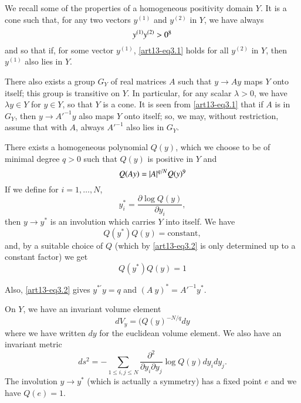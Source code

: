 We recall some of the properties of a homogeneous positivity domain $Y$. It is a cone such that, for any two vectors $y^{(1)}$ and $y^{(2)}$ in $Y$, we have always 
\setcounter{equation}{0}
\begin{equation}
y^{(1)}y^{(2)}>0\footnotemark[8]\label{art13-eq3.1}
\end{equation}
and so that if, for some vector $y^{(1)}$, \eqref{art13-eq3.1} holds for all $y^{(2)}$ in $Y$, then $y^{(1)}$ also lies in $Y$.

There also exists a group $G_{Y}$ of real matrices $A$ such that $y\to Ay$ maps $Y$ onto itself; this group is transitive on $Y$. In particular, for any scalar $\lambda>0$, we have $\lambda y\in Y$ for $y\in Y$, so that $Y$ is a cone. It is seen from \eqref{art13-eq3.1} that if $A$ is in $G_{Y}$, then $y\to {A'}^{-1}y$ also maps $Y$ onto itself; so, we may, without restriction, assume that with $A$, always ${A'}^{-1}$ also lies in $G_{Y}$.

There exists a homogeneous polynomial $Q(y)$, which we choose to be of minimal degree $q>0$ such that $Q(y)$ is positive in $Y$ and 
\begin{equation}
Q(Ay)=|A|^{q/N}Q(y)\footnotemark[9]\label{art13-eq3.2}
\end{equation}\pageoriginale
If we define for $i=1,\ldots,N$,\footnotemark[9]
\begin{equation}
y^{*}_{i}=\dfrac{\partial \log Q(y)}{\partial y_{i}},\label{art13-eq3.3}
\end{equation}
then $y\to y^{*}$ is an involution which carries $Y$ into itself. We have\footnotemark[9]
\begin{equation}
Q(y^{*})Q(y)=\text{constant},\label{art13-eq3.4}
\end{equation}
and, by a suitable choice of $Q$ (which by \eqref{art13-eq3.2} is only determined up to a constant factor) we get
\begin{equation*}
Q(y^{*})Q(y)=1\tag{3.4$'$}\label{art13-eq3.4'}
\end{equation*}

Also, \eqref{art13-eq3.2} gives $y^{*'}y=q$ and $(A \ y)^{*}={A'}^{-1}y^{*}$.

On $Y$, we have an invariant volume element
\begin{equation}
dV_{y}=(Q(y)^{-N/q}dy\label{art13-eq3.5}
\end{equation}
where we have written $dy$ for the euclidean volume element. We also have an invariant metric
\begin{equation}
ds^{2}=-\sum\limits_{1\leq i, j\leq N}\frac{\partial^{2}}{\partial y_{i}\partial y_{j}}\log Q(y) dy_{i}dy_{j}.
\end{equation}
The involution $y\to y^{*}$ (which is actually a symmetry) has a fixed point $e$ and we have $Q(e)=1$.

